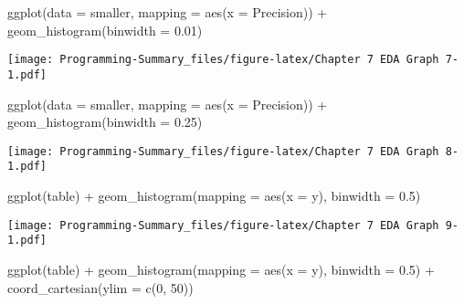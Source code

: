 \documentclass[
]{article}
\newenvironment{Shaded}{\begin{snugshade}}{\end{snugshade}}
\newcommand{\AttributeTok}[1]{\textcolor[rgb]{0.77,0.63,0.00}{#1}}
\newcommand{\DecValTok}[1]{\textcolor[rgb]{0.00,0.00,0.81}{#1}}
\newcommand{\FloatTok}[1]{\textcolor[rgb]{0.00,0.00,0.81}{#1}}
\newcommand{\FunctionTok}[1]{\textcolor[rgb]{0.00,0.00,0.00}{#1}}
\newcommand{\NormalTok}[1]{#1}
\newcommand{\SpecialCharTok}[1]{\textcolor[rgb]{0.00,0.00,0.00}{#1}}
\begin{document}
\begin{Shaded}
\begin{Highlighting}[]
\FunctionTok{ggplot}\NormalTok{(}\AttributeTok{data =}\NormalTok{ smaller, }\AttributeTok{mapping =} \FunctionTok{aes}\NormalTok{(}\AttributeTok{x =}\NormalTok{ Precision)) }\SpecialCharTok{+}
  \FunctionTok{geom\_histogram}\NormalTok{(}\AttributeTok{binwidth =} \FloatTok{0.01}\NormalTok{)}
\end{Highlighting}
\end{Shaded}

\texttt{[image: Programming-Summary\_files/figure-latex/Chapter 7 EDA Graph 7-1.pdf]}

\begin{Shaded}
\begin{Highlighting}[]
\FunctionTok{ggplot}\NormalTok{(}\AttributeTok{data =}\NormalTok{ smaller, }\AttributeTok{mapping =} \FunctionTok{aes}\NormalTok{(}\AttributeTok{x =}\NormalTok{ Precision)) }\SpecialCharTok{+} 
  \FunctionTok{geom\_histogram}\NormalTok{(}\AttributeTok{binwidth =} \FloatTok{0.25}\NormalTok{)}
\end{Highlighting}
\end{Shaded}

\texttt{[image: Programming-Summary\_files/figure-latex/Chapter 7 EDA Graph 8-1.pdf]}

\begin{Shaded}
\begin{Highlighting}[]
\FunctionTok{ggplot}\NormalTok{(table) }\SpecialCharTok{+} 
  \FunctionTok{geom\_histogram}\NormalTok{(}\AttributeTok{mapping =} \FunctionTok{aes}\NormalTok{(}\AttributeTok{x =}\NormalTok{ y), }\AttributeTok{binwidth =} \FloatTok{0.5}\NormalTok{)}
\end{Highlighting}
\end{Shaded}

\texttt{[image: Programming-Summary\_files/figure-latex/Chapter 7 EDA Graph 9-1.pdf]}

\begin{Shaded}
\begin{Highlighting}[]
\FunctionTok{ggplot}\NormalTok{(table) }\SpecialCharTok{+} 
  \FunctionTok{geom\_histogram}\NormalTok{(}\AttributeTok{mapping =} \FunctionTok{aes}\NormalTok{(}\AttributeTok{x =}\NormalTok{ y), }\AttributeTok{binwidth =} \FloatTok{0.5}\NormalTok{) }\SpecialCharTok{+}
  \FunctionTok{coord\_cartesian}\NormalTok{(}\AttributeTok{ylim =} \FunctionTok{c}\NormalTok{(}\DecValTok{0}\NormalTok{, }\DecValTok{50}\NormalTok{))}
\end{Highlighting}
\end{Shaded}
\end{document}
